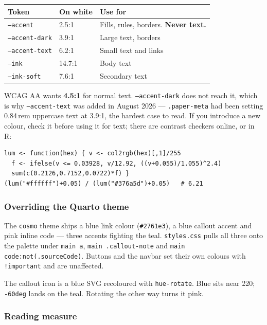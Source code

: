 \documentclass[11pt,a4paper]{article}
\newcommand{\file}[1]{\texttt{#1}}
\begin{document}
\begin{center}
\begin{tabular}{@{}llp{6.4cm}@{}}
\toprule
\textbf{Token} & \textbf{On white} & \textbf{Use for} \\
\midrule
\texttt{--accent}      & 2.5:1 & Fills, rules, borders. \textbf{Never text.} \\
\texttt{--accent-dark} & 3.9:1 & Large text, borders \\
\texttt{--accent-text} & 6.2:1 & Small text and links \\
\texttt{--ink}         & 14.7:1 & Body text \\
\texttt{--ink-soft}    & 7.6:1 & Secondary text \\
\bottomrule
\end{tabular}
\end{center}

WCAG AA wants \textbf{4.5:1} for normal text. \texttt{--accent-dark} does
not reach it, which is why \texttt{--accent-text} was added in August 2026
--- \texttt{.paper-meta} had been setting 0.84\,rem uppercase text at
3.9:1, the hardest case to read. If you introduce a new colour, check it
before using it for text; there are contrast checkers online, or in R:

\begin{lstlisting}
lum <- function(hex) { v <- col2rgb(hex)[,1]/255
  f <- ifelse(v <= 0.03928, v/12.92, ((v+0.055)/1.055)^2.4)
  sum(c(0.2126,0.7152,0.0722)*f) }
(lum("#ffffff")+0.05) / (lum("#376a5d")+0.05)   # 6.21
\end{lstlisting}

\subsubsection*{Overriding the Quarto theme}

The \texttt{cosmo} theme ships a blue link colour (\texttt{\#2761e3}), a
blue callout accent and pink inline code --- three accents fighting the
teal. \file{styles.css} pulls all three onto the palette under
\texttt{main a}, \texttt{main .callout-note} and
\texttt{main code:not(.sourceCode)}. Buttons and the navbar set their own
colours with \texttt{!important} and are unaffected.

The callout icon is a blue SVG recoloured with \texttt{hue-rotate}. Blue
sits near 220\textdegree; \texttt{-60deg} lands on the teal. Rotating the
other way turns it pink.

\subsubsection*{Reading measure}
\end{document}
